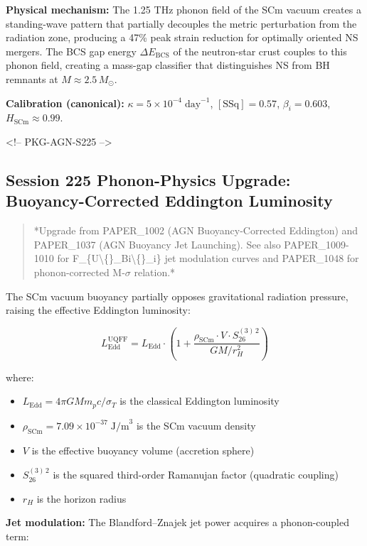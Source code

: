 \documentclass[11pt]{article}
\begin{document}
\textbf{Physical mechanism:} The 1.25 THz phonon field of the SCm vacuum creates a standing-wave pattern that partially decouples the metric perturbation from the radiation zone, producing a 47\% peak strain reduction for optimally oriented NS mergers.  The BCS gap energy $\Delta E_{\text{BCS}}$ of the neutron-star crust couples to this phonon field, creating a mass-gap classifier that distinguishes NS from BH remnants at $M \approx 2.5\,M_\odot$.

\textbf{Calibration (canonical):} $\kappa = 5 \times 10^{-4}\;\text{day}^{-1}$, $[\text{SSq}] = 0.57$, $\beta_i = 0.603$, $H_{\text{SCm}} \approx 0.99$.

<!-- PKG-AGN-S225 -->

\subsection*{Session 225 Phonon-Physics Upgrade: Buoyancy-Corrected Eddington Luminosity}

\begin{quote}
*Upgrade from PAPER\_1002 (AGN Buoyancy-Corrected Eddington) and PAPER\_1037
(AGN Buoyancy Jet Launching).  See also PAPER\_1009-1010 for F\_\{U\textbackslash\{\}\_Bi\textbackslash\{\}\_i\} jet
modulation curves and PAPER\_1048 for phonon-corrected M-$\sigma$ relation.*
\end{quote}

The SCm vacuum buoyancy partially opposes gravitational radiation pressure, raising the effective Eddington luminosity:

$$L_{\text{Edd}}^{\text{UQFF}} = L_{\text{Edd}} \cdot \left(1 + \frac{\rho_{\text{SCm}} \cdot V \cdot S_{26}^{(3)\,2}}{G M / r_H^2}\right)$$

where:

\begin{itemize}
  \item $L_{\text{Edd}} = 4\pi G M m_p c / \sigma_T$ is the classical Eddington luminosity
  \item $\rho_{\text{SCm}} = 7.09 \times 10^{-37}\;\text{J/m}^3$ is the SCm vacuum density
  \item $V$ is the effective buoyancy volume (accretion sphere)
  \item $S_{26}^{(3)\,2}$ is the squared third-order Ramanujan factor (quadratic coupling)
  \item $r_H$ is the horizon radius
\end{itemize}

\textbf{Jet modulation:} The Blandford--Znajek jet power acquires a phonon-coupled term:
\end{document}
